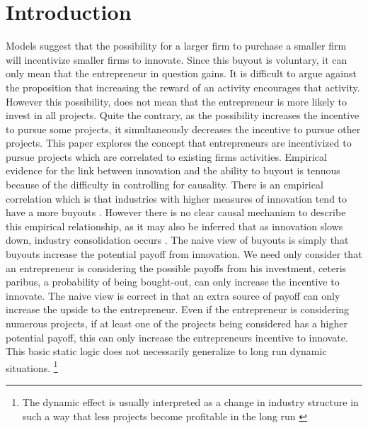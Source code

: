\documentclass[12pt]{report}
\numberwithin{equation}{section}
\begin{document}
\section{Introduction}
Models suggest that the possibility for a larger firm to purchase a smaller firm will incentivize smaller firms to innovate. Since this buyout is voluntary, it can only mean that the entrepreneur in question gains. It is difficult to argue against the proposition that increasing the reward of an activity encourages that activity. However this possibility, does not mean that the entrepreneur is more likely to invest in all projects. Quite the contrary, as the possibility increases the incentive to pursue some projects, it simultaneously decreases the incentive to pursue other projects. This paper explores the concept that entrepreneurs are incentivized to pursue projects which are correlated to existing firms activities.
Empirical evidence for the link between innovation and the ability to buyout is tenuous because of the difficulty in controlling for causality. There is an empirical correlation which is that industries with higher measures of innovation tend to have a more buyouts \citep{HAU}. However there is no clear causal mechanism to describe this empirical relationship, as it may also be inferred that as innovation slows down, industry consolidation occurs \citep{COM}. 
The naive view of buyouts is simply that buyouts increase the potential payoff from innovation. We need only consider that an entrepreneur is considering the possible payoffs from his investment, ceteris paribus, a probability of being bought-out, can only increase the incentive to innovate. The naive view is correct in that an extra source of payoff can only increase the upside to the entrepreneur. Even if the entrepreneur is considering numerous projects, if at least one of the projects being considered has a higher potential payoff, this can only increase the entrepreneurs incentive to innovate. This basic static logic does not necessarily generalize to long run dynamic situations. \footnote{The dynamic effect is usually interpreted as a change in industry structure in such a way that less projects become profitable in the long run \cite{bessen_maskin}}
\end{document}
